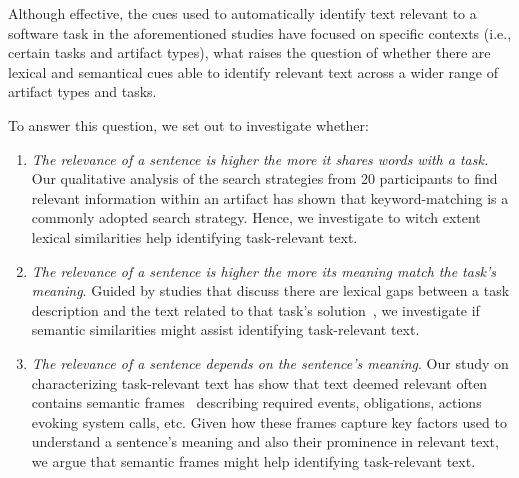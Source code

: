 Although effective, the cues used to automatically identify text relevant to a software task in the aforementioned studies have focused on specific contexts (i.e., certain tasks and artifact types), what raises the question of 
whether there are lexical and semantical cues able to identify relevant text across a wider range of artifact types and tasks.


To answer this question, we set out to investigate whether:


\begin{enumerate}
    \item \textit{The relevance of a sentence is higher the more it shares words with a task.} Our qualitative analysis of the search strategies from 20 participants to find relevant information within an artifact has shown that keyword-matching is a commonly adopted search strategy. Hence, we investigate to witch extent lexical similarities help identifying task-relevant text.

    \item \textit{The relevance of a sentence is higher the more its meaning match the task's meaning}.
    Guided by studies that discuss there are lexical gaps between a task description and the text related to that task's solution~\cite{silva2019,fucci2019, Huang2018, Ye2016}, we investigate if semantic similarities might assist identifying task-relevant text. 

    \item \textit{The relevance of a sentence depends on the sentence's meaning}. Our study on characterizing task-relevant text has show that text deemed relevant often contains semantic frames~\cite{fillmore1976frame} describing 
     required events, obligations, actions evoking system calls, etc.
    Given how these frames capture key factors used to understand a sentence's meaning
    and also their prominence in relevant text, 
    we argue that semantic frames might help identifying  task-relevant text.
\end{enumerate}









